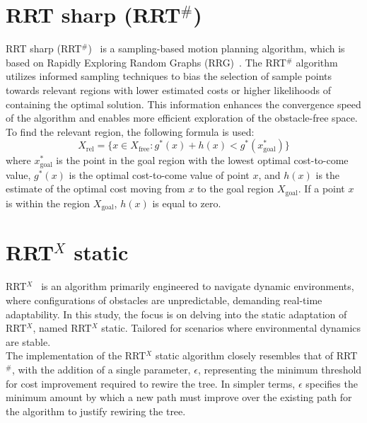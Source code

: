 \documentclass{ctuthesis}
\begin{document}
\section{\texorpdfstring{RRT sharp (RRT$^\#$)}{Title without Superscript}}
RRT sharp (RRT$^\#$)~\cite{arslan2012rrtsharp} is a sampling-based motion planning algorithm, 
which is based on Rapidly Exploring Random Graphs (RRG)~\cite{Karaman2009RRG}. 
The RRT$^\#$ algorithm utilizes informed sampling techniques to bias the selection of sample 
points towards relevant regions with lower estimated costs or higher likelihoods of containing the optimal solution. 
This information enhances the convergence speed of the algorithm and 
enables more efficient exploration of the obstacle-free space.
\\[12pt]
To find the relevant region, the following formula is used:
\[
X_{\text{rel}} = \{ x \in X_{\text{free}} : g^*(x) + h(x) < g^*(x^*_{\text{goal}}) \}
\]
where \( x^*_{\text{goal}} \) is the point in the goal 
region with the lowest optimal cost-to-come value, 
\( g^*(x) \) is the optimal cost-to-come value of 
point \( x \), and \( h(x) \) is the estimate of the 
optimal cost moving from \( x \) to the goal region \( X_{\text{goal}} \).
If a point \( x \) is within the region \( X_{\text{goal}} \), \( h(x) \) is equal to zero.
\section{\texorpdfstring{RRT$^X$ static}{Title without Superscript}}
RRT$^X$~\cite{Otte2015RRTX} is an algorithm primarily engineered to navigate dynamic environments, 
where configurations of obstacles are unpredictable, demanding real-time adaptability.
In this study, 
the focus is on delving into the static adaptation of RRT$^X$, named RRT$^X$ static. 
Tailored for scenarios where environmental dynamics are stable.
\\[12pt]
The implementation of the RRT$^X$ static algorithm closely resembles that of RRT$^\#$, 
with the addition of a single parameter, 
$\epsilon$, representing the minimum threshold for cost improvement required to rewire the tree. 
In simpler terms, 
$\epsilon$ specifies the minimum amount by which a new path must improve over the existing path 
for the algorithm to justify rewiring the tree.
\end{document}
